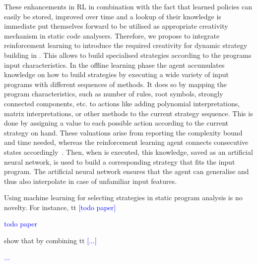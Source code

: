 \documentclass[envcountsame]{llncs}
\newcommand\MS[2][r]{\ifx t#1 \textcolor{blue}{[#2]}%
\else \begin{center}\textcolor{blue}{#2} \end{center} \fi}%
\begin{document}
These enhancements in RL in combination with the fact that learned policies can easily be stored,
improved over time and a lookup of their knowledge is immediate put themselves forward to be
utilised as appropriate creativity mechanism in static code analysers.
%
Therefore, we propose to integrate reinforcement learning to introduce the required creativity for
dynamic strategy building in \tct{}. This allows to build specialised strategies according to the
programs input characteristics.
%
In the offline learning phase the agent accumulates knowledge on how to build strategies by
executing a wide variety of input programs with different sequences of methods. It does so by
mapping the program characteristics, such as number of rules, root symbols, strongly connected
components, etc\@. to actions like adding polynomial interpretations, matrix interpretations, or
other methods to the current strategy sequence. This is done by assigning a value to each possible
action according to the current strategy on hand. These valuations arise from reporting the
complexity bound and time needed, whereas the reinforcement learning agent connects consecutive
states accordingly~\cite{sutton1998introduction}.
%
Then, when \tct{} is executed, this knowledge, saved as an artificial neural network, is used to
build a corresponding strategy that fits the input program. The artificial neural network ensures
that the agent can generalise and thus also interpolate in case of unfamiliar input features.

%


Using machine learning for selecting strategies in static program analysis is no novelty. For
instance, \MS[t]{todo paper} show that by combining \MS[t]{...}


\end{document}
